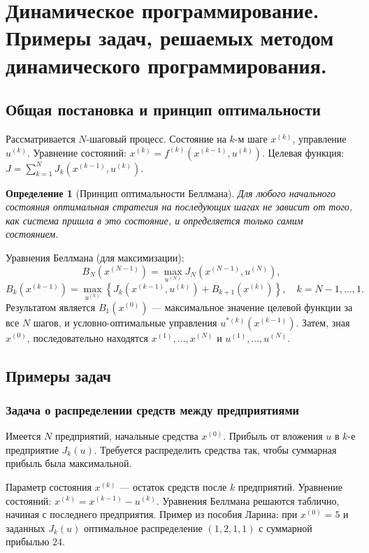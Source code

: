 \documentclass{article}
\theoremstyle{plain}
\newtheorem{definition}[theorem]{Определение}
\begin{document}
\section{Динамическое программирование. Примеры задач, решаемых методом динамического программирования.}

\subsection{Общая постановка и принцип оптимальности}
Рассматривается $N$-шаговый процесс. Состояние на $k$-м шаге $x^{(k)}$, управление $u^{(k)}$. Уравнение состояний: $x^{(k)} = f^{(k)}(x^{(k-1)}, u^{(k)})$. Целевая функция: $J = \sum_{k=1}^N J_k(x^{(k-1)}, u^{(k)})$.

\begin{definition}[Принцип оптимальности Беллмана]
Для любого начального состояния оптимальная стратегия на последующих шагах не зависит от того, как система пришла в это состояние, и определяется только самим состоянием.
\end{definition}

Уравнения Беллмана (для максимизации):
\[
B_N(x^{(N-1)}) = \max_{u^{(N)}} J_N(x^{(N-1)}, u^{(N)}),
\]
\[
B_k(x^{(k-1)}) = \max_{u^{(k)}} \left\{ J_k(x^{(k-1)}, u^{(k)}) + B_{k+1}(x^{(k)}) \right\},\quad k = N-1,\dots,1.
\]
Результатом является $B_1(x^{(0)})$ — максимальное значение целевой функции за все $N$ шагов, и условно-оптимальные управления $u^{*(k)}(x^{(k-1)})$. Затем, зная $x^{(0)}$, последовательно находятся $x^{(1)},\dots,x^{(N)}$ и $u^{(1)},\dots,u^{(N)}$.

\subsection{Примеры задач}

\subsubsection{Задача о распределении средств между предприятиями}
Имеется $N$ предприятий, начальные средства $x^{(0)}$. Прибыль от вложения $u$ в $k$-е предприятие $J_k(u)$. Требуется распределить средства так, чтобы суммарная прибыль была максимальной.

Параметр состояния $x^{(k)}$ — остаток средств после $k$ предприятий. Уравнение состояний: $x^{(k)} = x^{(k-1)} - u^{(k)}$. Уравнения Беллмана решаются таблично, начиная с последнего предприятия. Пример из пособия Ларина: при $x^{(0)}=5$ и заданных $J_k(u)$ оптимальное распределение $(1,2,1,1)$ с суммарной прибылью $24$.
\end{document}
